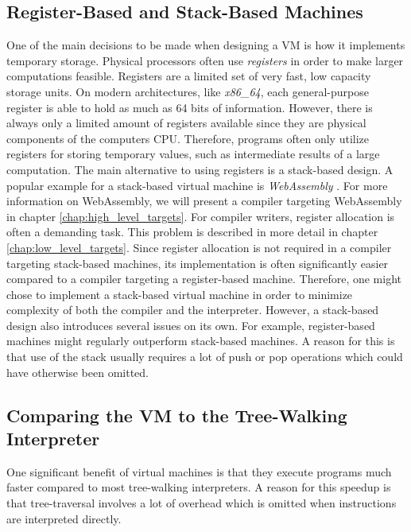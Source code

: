 \subsection{Register-Based and Stack-Based Machines}

One of the main decisions to be made when designing a VM is how it implements temporary storage.
Physical processors often use \emph{registers} in order to make larger computations feasible.
Registers are a limited set of very fast, low capacity storage units.
On modern architectures, like \emph{x86\_64}, each general-purpose register is able to hold as much as 64 bits of information.
However, there is always only a limited amount of registers available since they are physical components of the computers CPU.
Therefore, programs often only utilize registers for storing temporary values, such as intermediate results of a large computation.
The main alternative to using registers is a stack-based design.
A popular example for a stack-based virtual machine is \emph{WebAssembly} \cite[p.~44]{Sendil2022-fy}.
For more information on WebAssembly, we will present a compiler targeting WebAssembly in chapter \ref{chap:high_level_targets}.
For compiler writers, register allocation is often a demanding task.
This problem is described in more detail in chapter \ref{chap:low_level_targets}.
Since register allocation is not required in a compiler targeting stack-based machines, its implementation is often significantly easier compared to a compiler targeting a register-based machine.
Therefore, one might chose to implement a stack-based virtual machine in order to minimize complexity of both the compiler and the interpreter.
However, a stack-based design also introduces several issues on its own.
For example, register-based machines might regularly outperform stack-based machines.
A reason for this is that use of the stack usually requires a lot of push or pop operations which could have otherwise been omitted.

\subsection{Comparing the VM to the Tree-Walking Interpreter}
One significant benefit of virtual machines is that they execute programs much faster compared to most tree-walking interpreters.
A reason for this speedup is that tree-traversal involves a lot of overhead which is omitted when instructions are interpreted directly.


